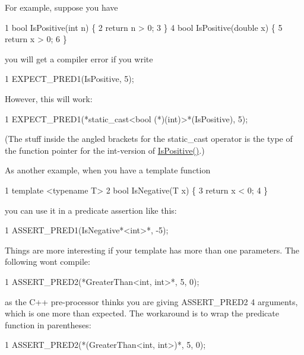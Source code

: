 For example, suppose you have


\begin{DoxyCode}
1 bool IsPositive(int n) \{
2   return n > 0;
3 \}
4 bool IsPositive(double x) \{
5   return x > 0;
6 \}
\end{DoxyCode}


you will get a compiler error if you write


\begin{DoxyCode}
1 EXPECT\_PRED1(IsPositive, 5);
\end{DoxyCode}


However, this will work\+:


\begin{DoxyCode}
1 EXPECT\_PRED1(*static\_cast<bool (*)(int)>*(IsPositive), 5);
\end{DoxyCode}


(The stuff inside the angled brackets for the {\ttfamily static\+\_\+cast} operator is the type of the function pointer for the {\ttfamily int}-\/version of {\ttfamily \hyperlink{namespacetesting_1_1gmock__matchers__test_a70e728cf67d0224c3ebb9eb8959cc39d}{Is\+Positive()}}.)

As another example, when you have a template function


\begin{DoxyCode}
1 template <typename T>
2 bool IsNegative(T x) \{
3   return x < 0;
4 \}
\end{DoxyCode}


you can use it in a predicate assertion like this\+:


\begin{DoxyCode}
1 ASSERT\_PRED1(IsNegative*<int>*, -5);
\end{DoxyCode}


Things are more interesting if your template has more than one parameters. The following won\textquotesingle{}t compile\+:


\begin{DoxyCode}
1 ASSERT\_PRED2(*GreaterThan<int, int>*, 5, 0);
\end{DoxyCode}


as the C++ pre-\/processor thinks you are giving {\ttfamily A\+S\+S\+E\+R\+T\+\_\+\+P\+R\+E\+D2} 4 arguments, which is one more than expected. The workaround is to wrap the predicate function in parentheses\+:


\begin{DoxyCode}
1 ASSERT\_PRED2(*(GreaterThan<int, int>)*, 5, 0);
\end{DoxyCode}


